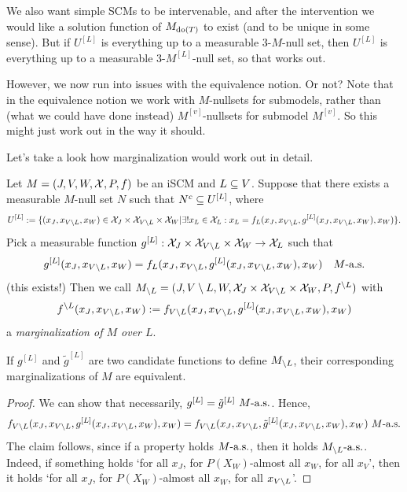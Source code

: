 We also want simple SCMs to be intervenable, and after the intervention we would like a solution function of $M_{\operatorname{do}(T)}$ to exist (and to be unique in some sense).
But if $U^{[L]}$ is everything up to a measurable 3-$M$-null set, then $U^{[L]}$ is everything up to a measurable 3-$M^{[L]}$-null set, so that works out.

However, we now run into issues with the equivalence notion.
Or not? Note that in the equivalence notion we work with $M$-nullsets for submodels, rather than (what we could have done instead) $M^{[v]}$-nullsets for submodel $M^{[v]}$.
So this might just work out in the way it should.

Let's take a look how marginalization would work out in detail.

\begin{Def}\label{def:scm_marginalization}
  Let $M = \left ( J, V, W, \mathcal{X}, P, f \right )$ be an iSCM and $L \subseteq V$.
  Suppose that there exists a measurable $M$-null set $N$ such that $N^c \subseteq U^{[L]}$, where
  $$U^{[L]} := \{(x_J,x_{V\setminus L},x_W) \in \mathcal{X}_J \times \mathcal{X}_{V\setminus L} \times \mathcal{X}_W | \exists! x_L \in \mathcal{X}_L : x_L = f_L(x_J,x_{V\setminus L},g^{[L]}(x_J,x_{V\setminus L},x_W),x_W)\}.$$
  Pick a measurable function
    $g^{[L]} : \mathcal{X}_J \times \mathcal{X}_{V \setminus L} \times \mathcal{X}_W \to \mathcal{X}_L$ such that 
  $$g^{[L]}(x_J,x_{V\setminus L},x_W) = f_L(x_J,x_{V\setminus L},g^{[L]}(x_J,x_{V\setminus L},x_W),x_W)\quad M\text{-a.s.}$$
  (this exists!) 
  Then we call $M_{\setminus L} = ( J, V \setminus L, W, \mathcal{X}_{J} \times \mathcal{X}_{V \setminus L} \times \mathcal{X}_{W}, P, f^{\setminus L} )$ with
  $$f^{\setminus L}(x_{J},x_{V \setminus L},x_{W}) := f_{V \setminus L}(x_{J},x_{V \setminus L},g^{[L]}(x_{J},x_{V \setminus L},x_{W}),x_{W})$$
  a \emph{marginalization of $M$ over $L$}.
\end{Def}
\begin{Rem}\label{rem:scm_marginalization}
  If $g^{[L]}$ and $\tilde g^{[L]}$ are two candidate functions to define $M_{\setminus L}$, their corresponding marginalizations of $M$ are equivalent.
\end{Rem}
\begin{proof}
  We can show that necessarily, $g^{[L]} = \tilde{g}^{[L]}\ M\text{-a.s.}$.
  Hence, 
  $$f_{V \setminus L}(x_{J},x_{V \setminus L},g^{[L]}(x_{J},x_{V \setminus L},x_{W}),x_{W}) = f_{V \setminus L}(x_{J},x_{V \setminus L},\tilde g^{[L]}(x_{J},x_{V \setminus L},x_{W}),x_{W})\ M\text{-a.s.}$$
  The claim follows, since if a property holds $M\text{-a.s.}$, then it holds $M_{\setminus L}\text{-a.s.}$.
  Indeed, if something holds `for all $x_J$, for $P(X_W)$-almost all $x_W$, for all $x_V$', then it holds `for all $x_J$, for $P(X_W)$-almost all $x_W$, for all $x_{V\setminus L}$'.
\end{proof}
